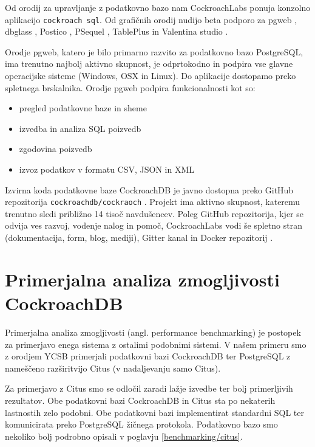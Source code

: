 \documentclass[a4paper, 12pt]{book}
\begin{document}
Od orodij za upravljanje z podatkovno bazo nam CockroachLabs ponuja konzolno aplikacijo \texttt{cockroach sql}. Od grafičnih orodij nudijo beta podporo \cite{CRDB-meta-vizualizers} za pgweb \cite{pgweb-home}, dbglass \cite{dbglass-home}, Postico \cite{postico-home}, PSequel \cite{psequel-home}, TablePlus \cite{tableplus-home} in Valentina studio \cite{valentinastudio-home}.

Orodje pgweb, katero je bilo primarno razvito za podatkovno bazo PostgreSQL, ima trenutno najbolj aktivno skupnost, je odprtokodno in podpira vse glavne operacijske sisteme (Windows, OSX in Linux). Do aplikacije dostopamo preko spletnega brskalnika. Orodje pgweb podpira funkcionalnosti kot so:

\begin{itemize}
    \item pregled podatkovne baze in sheme
    \item izvedba in analiza SQL poizvedb
    \item zgodovina poizvedb
    \item izvoz podatkov v formatu CSV, JSON in XML
\end{itemize}

Izvirna koda podatkovne baze CockroachDB je javno dostopna preko GitHub repozitorija \texttt{cockroachdb/cockraoch} \cite{cockroachdb/cockroach}. Projekt ima aktivno skupnost, kateremu trenutno sledi približno 14 tisoč navdušencev. Poleg GitHub repozitorija, kjer se odvija ves razvoj, vodenje nalog in pomoč, CockroachLabs vodi še spletno stran \cite{CRDB-home} (dokumentacija, form, blog, mediji), Gitter kanal \cite{CRDB-gitter} in Docker repozitorij \cite{CRDB-docker}.

\chapter{Primerjalna analiza zmogljivosti CockroachDB}

Primerjalna analiza zmogljivosti (angl. performance benchmarking) je postopek za primerjavo enega sistema z ostalimi podobnimi sistemi. V našem primeru smo z orodjem YCSB primerjali podatkovni bazi CockroachDB ter PostgreSQL z nameščeno razširitvijo Citus (v nadaljevanju samo Citus). 

Za primerjavo z Citus smo se odločil zaradi lažje izvedbe ter bolj primerljivih rezultatov. Obe podatkovni bazi CockroachDB in Citus sta po nekaterih lastnostih zelo podobni. Obe podatkovni bazi implementirat standardni SQL ter komunicirata preko PostgreSQL žičnega protokola. Podatkovno bazo smo nekoliko bolj podrobno opisali v poglavju \ref{benchmarking/citus}.
\end{document}
